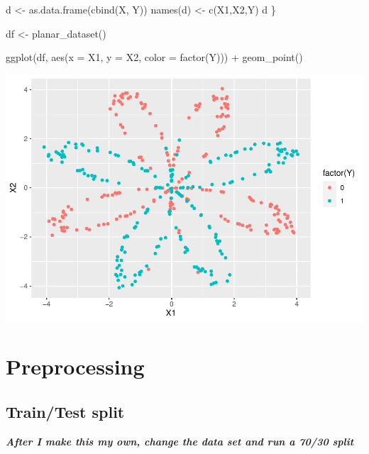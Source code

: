 \documentclass[
]{article}
\newenvironment{Shaded}{\begin{snugshade}}{\end{snugshade}}
\newcommand{\AttributeTok}[1]{\textcolor[rgb]{0.77,0.63,0.00}{#1}}
\newcommand{\FunctionTok}[1]{\textcolor[rgb]{0.00,0.00,0.00}{#1}}
\newcommand{\NormalTok}[1]{#1}
\newcommand{\OtherTok}[1]{\textcolor[rgb]{0.56,0.35,0.01}{#1}}
\newcommand{\SpecialCharTok}[1]{\textcolor[rgb]{0.00,0.00,0.00}{#1}}
\newcommand{\StringTok}[1]{\textcolor[rgb]{0.31,0.60,0.02}{#1}}
\begin{document}
\begin{Shaded}
\begin{Highlighting}[]
\NormalTok{  d }\OtherTok{\textless{}{-}} \FunctionTok{as.data.frame}\NormalTok{(}\FunctionTok{cbind}\NormalTok{(X, Y))}
  \FunctionTok{names}\NormalTok{(d) }\OtherTok{\textless{}{-}} \FunctionTok{c}\NormalTok{(}\StringTok{\textquotesingle{}X1\textquotesingle{}}\NormalTok{,}\StringTok{\textquotesingle{}X2\textquotesingle{}}\NormalTok{,}\StringTok{\textquotesingle{}Y\textquotesingle{}}\NormalTok{)}
\NormalTok{  d}
\NormalTok{\}}


\NormalTok{df }\OtherTok{\textless{}{-}} \FunctionTok{planar\_dataset}\NormalTok{()}


\FunctionTok{ggplot}\NormalTok{(df, }\FunctionTok{aes}\NormalTok{(}\AttributeTok{x =}\NormalTok{ X1, }\AttributeTok{y =}\NormalTok{ X2, }\AttributeTok{color =} \FunctionTok{factor}\NormalTok{(Y))) }\SpecialCharTok{+}
  \FunctionTok{geom\_point}\NormalTok{()}
\end{Highlighting}
\end{Shaded}

\includegraphics{BabyNeuralNet_files/unnamed-chunk-1-1.pdf}

\hypertarget{preprocessing}{%
\section{Preprocessing}\label{preprocessing}}

\hypertarget{traintest-split}{%
\subsection{Train/Test split}\label{traintest-split}}

\textbf{\emph{After I make this my own, change the data set and run a
70/30 split}}
\end{document}
